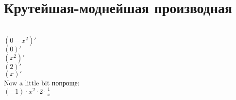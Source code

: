 \documentclass[a4paper,12pt]{article}
\begin{document}
\section*{Крутейшая-моднейшая производная}\\
\begin{math}
	(0 - x ^{2} )'
\end{math}\\
\begin{math}
	(0)'
\end{math}\\
\begin{math}
	(x ^{2} )'
\end{math}\\
\begin{math}
	(2)'
\end{math}\\
\begin{math}
	(x)'
\end{math}\\
Now a little bit попроще:\\
\begin{math}
	(-1) \cdot x ^{2}  \cdot 2 \cdot  \frac{1}{x} \end{math}
\end{document}
